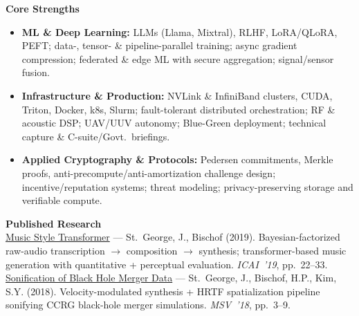\documentclass[10.5pt]{res}
\begin{document}
\begin{resume}
{\bf Core Strengths} \\
\begin{itemize}
    \item \textbf{ML \& Deep Learning:} LLMs (Llama, Mixtral), RLHF, LoRA/QLoRA, PEFT; data-, tensor- \& pipeline-parallel training; async gradient compression; federated \& edge ML with secure aggregation; signal/sensor fusion.
    \item \textbf{Infrastructure \& Production:} NVLink \& InfiniBand clusters, CUDA, Triton, Docker, k8s, Slurm; fault-tolerant distributed orchestration; RF \& acoustic DSP; UAV/UUV autonomy; Blue-Green deployment; technical capture \& C-suite/Govt.\ briefings.
    \item \textbf{Applied Cryptography \& Protocols:} Pedersen commitments, Merkle proofs, anti-precompute/anti-amortization challenge design; incentive/reputation systems; threat modeling; privacy-preserving storage and verifiable compute.
\end{itemize}

{\bf Published Research} \\
\href{https://drive.google.com/file/d/1Xps3u00zFacalEtLFYzkAAy0NfmRkHLB/view?usp=sharing}{Music Style Transformer} --- St.\ George, J., Bischof (2019). Bayesian-factorized raw-audio transcription $\rightarrow$ composition $\rightarrow$ synthesis; transformer-based music generation with quantitative + perceptual evaluation. \textit{ICAI~'19}, pp.~22--33.\\[0.15cm]
\href{https://drive.google.com/file/d/1pdxPst1CBMQQrgR2OGiBcKQgI_Hzg6gX/view?usp=sharing}{Sonification of Black Hole Merger Data} --- St.\ George, J., Bischof, H.P., Kim, S.Y. (2018). Velocity-modulated synthesis + HRTF spatialization pipeline sonifying CCRG black-hole merger simulations. \textit{MSV~'18}, pp.~3--9.
\vspace{.27 cm}


\end{resume}
\end{document}
